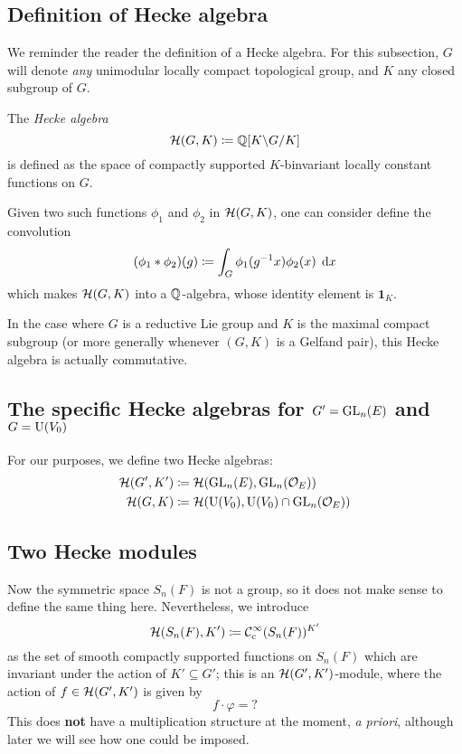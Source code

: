 \subsection{Definition of Hecke algebra}
We reminder the reader the definition of a Hecke algebra.
For this subsection, $G$ will denote \emph{any}
unimodular locally compact topological group,
and $K$ any closed subgroup of $G$.

\begin{definition}
  The \emph{Hecke algebra}
  \[ \mathcal H(G, K) \coloneqq \mathbb Q[K \backslash G \slash K] \]
  is defined as the space of compactly supported $K$-binvariant
  locally constant functions on $G$.

  Given two such functions $\phi_1$ and $\phi_2$ in $\mathcal H(G,K)$,
  one can consider define the convolution
  \[ (\phi_1 \ast \phi_2)(g) \coloneqq \int_G \phi_1(g\inv x) \phi_2(x) \; \odif x \]
  which makes $\mathcal H(G, K)$ into a $\mathbb Q$-algebra,
  whose identity element is $\mathbf{1}_K$.
\end{definition}
In the case where $G$ is a reductive Lie group and
$K$ is the maximal compact subgroup
(or more generally whenever $(G,K)$ is a Gelfand pair),
this Hecke algebra is actually commutative.

\subsection{The specific Hecke algebras for $G' = \operatorname{GL}_n(E)$ and $G = \operatorname{U}(V_0)$}
For our purposes, we define two Hecke algebras:
\begin{align*}
  \mathcal H(G', K') &\coloneqq \mathcal H(\operatorname{GL}_n(E), \operatorname{GL}_n(\mathcal O_E)) \\
  \mathcal H(G, K) &\coloneqq \mathcal H(\operatorname{U}(V_0), \operatorname{U}(V_0) \cap \operatorname{GL}_n(\mathcal O_E))
\end{align*}

\subsection{Two Hecke modules}
Now the symmetric space $S_n(F)$ is not a group,
so it does not make sense to define the same thing here.
Nevertheless, we introduce
\[ \mathcal H(S_n(F), K') \coloneqq \mathcal C_{\mathrm{c}}^{\infty}(S_n(F))^{K'} \]
as the set of smooth compactly supported functions on $S_n(F)$
which are invariant under the action of $K' \subseteq G'$;
this is an $\mathcal H(G', K')$-module, where the action of $f \in \mathcal H(G', K')$ is given by
\[ f \cdot \varphi = {?} \]
This does \textbf{not} have a multiplication structure at the moment, \emph{a priori},
although later we will see how one could be imposed.

